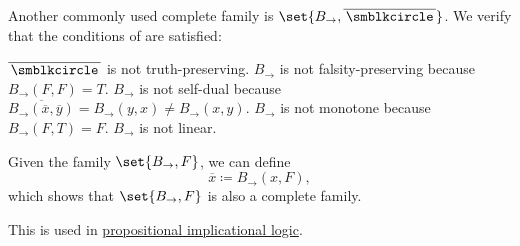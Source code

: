 \begin{example}
\begin{thmenum}
     Another commonly used complete family is \( \set{ B_\rightarrow, \overline{\placeholder} } \).
    We verify that the conditions of  are satisfied:
    \begin{refenum}
       \( \overline{\placeholder} \) is not truth-preserving.
       \( B_\rightarrow \) is not falsity-preserving because \( B_\rightarrow(F, F) = T \).
       \( B_\rightarrow \) is not self-dual because \( \overline{B_\rightarrow(\overline{x}, \overline{y})} = B_\rightarrow(y, x) \neq B_\rightarrow(x, y) \).
       \( B_\rightarrow \) is not monotone because \( B_\rightarrow(F, T) = F \).
       \( B_\rightarrow \) is not linear.
    \end{refenum}

     Given the family \( \set{ B_\rightarrow, F } \), we can define
    \begin{equation*}
      \overline{x} \coloneqq B_\rightarrow(x, F),
    \end{equation*}
    which shows that \( \set{ B_\rightarrow, F } \) is also a complete family.

    This is used in \hyperref[def:propositional_implicational_logic]{propositional implicational logic}.
  \end{thmenum}
\end{example}
